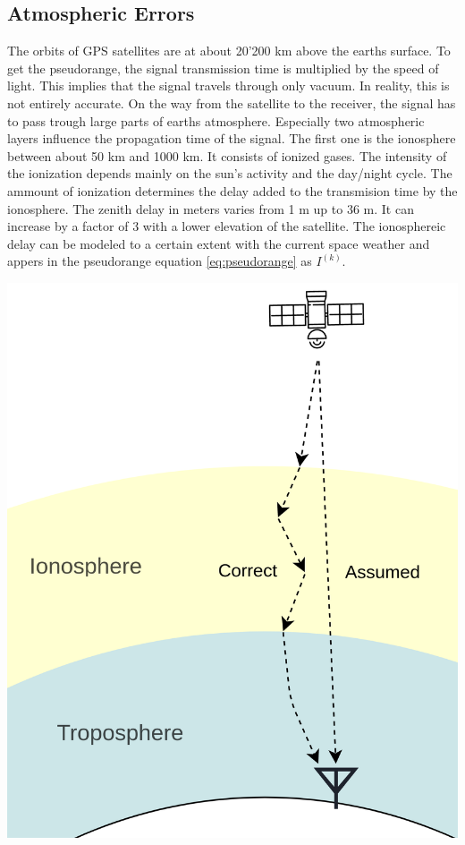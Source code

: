 \subsection{Atmospheric Errors}

\begin{minipage}{0.6\textwidth}
  The orbits of GPS satellites are at about 20'200 km above the earths surface.
  To get the pseudorange, the signal transmission time is multiplied by the speed of light.
  This implies that the signal travels through only vacuum.
  In reality, this is not entirely accurate.
  On the way from the satellite to the receiver, the signal has to pass trough large parts of earths atmosphere.
  Especially two atmospheric layers influence the propagation time of the signal.
  The first one is the ionosphere between about 50 km and 1000 km.
  It consists of ionized gases.
  The intensity of the ionization depends mainly on the sun's activity and the day/night cycle.
  The ammount of ionization determines the delay added to the transmision time by the ionosphere.
  The zenith delay in meters varies from 1 m up to 36 m. 
  It can increase by a factor of 3 with a lower elevation of the satellite.
  The ionosphereic delay can be modeled to a certain extent with the current space weather and appers in the pseudorange equation \ref{eq:pseudorange} as $I^{(k)}$.
\end{minipage}
\hfill
\begin{minipage}{0.38\textwidth}
 \includegraphics[width=\textwidth]{images/Atmospheric_Errors.png}
\end{minipage}

